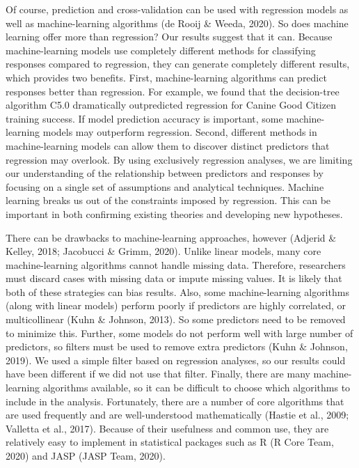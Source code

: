 \documentclass[
  english,
  ,pub,floatsintext]{apa6}
\begin{document}
Of course, prediction and cross-validation can be used with regression models as well as machine-learning algorithms (de Rooij \& Weeda, 2020). So does machine learning offer more than regression? Our results suggest that it can. Because machine-learning models use completely different methods for classifying responses compared to regression, they can generate completely different results, which provides two benefits. First, machine-learning algorithms can predict responses better than regression. For example, we found that the decision-tree algorithm C5.0 dramatically outpredicted regression for Canine Good Citizen training success. If model prediction accuracy is important, some machine-learning models may outperform regression. Second, different methods in machine-learning models can allow them to discover distinct predictors that regression may overlook. By using exclusively regression analyses, we are limiting our understanding of the relationship between predictors and responses by focusing on a single set of assumptions and analytical techniques. Machine learning breaks us out of the constraints imposed by regression. This can be important in both confirming existing theories and developing new hypotheses.

There can be drawbacks to machine-learning approaches, however (Adjerid \& Kelley, 2018; Jacobucci \& Grimm, 2020). Unlike linear models, many core machine-learning algorithms cannot handle missing data. Therefore, researchers must discard cases with missing data or impute missing values. It is likely that both of these strategies can bias results. Also, some machine-learning algorithms (along with linear models) perform poorly if predictors are highly correlated, or multicollinear (Kuhn \& Johnson, 2013). So some predictors need to be removed to minimize this. Further, some models do not perform well with large number of predictors, so filters must be used to remove extra predictors (Kuhn \& Johnson, 2019). We used a simple filter based on regression analyses, so our results could have been different if we did not use that filter. Finally, there are many machine-learning algorithms available, so it can be difficult to choose which algorithms to include in the analysis. Fortunately, there are a number of core algorithms that are used frequently and are well-understood mathematically (Hastie et al., 2009; Valletta et al., 2017). Because of their usefulness and common use, they are relatively easy to implement in statistical packages such as R (R Core Team, 2020) and JASP (JASP Team, 2020).
\end{document}
